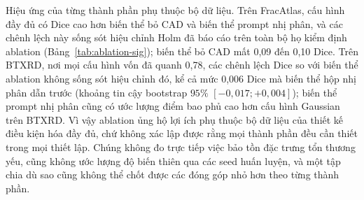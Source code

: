 \documentclass[11pt]{article}
\begin{document}
\begin{table}[H]
\caption{So sánh bắt cặp mô hình đầy đủ với từng biến thể, Dice từng ảnh trên một tập chia. $\Delta$ là chênh Dice trung bình từng ảnh (đầy đủ trừ biến thể), kiểm định hoán vị bắt cặp đổi dấu hai phía ($20{.}000$ lần). $^{**}$ đánh dấu ô còn ý nghĩa ($p<0{,}05$) sau hiệu chỉnh Holm trên toàn bộ họ kiểm định ablation (bốn biến thể ablation $\times$ hai bộ dữ liệu $\times$ hai điều kiện prompt, tất cả trên Dice, độ đo duy nhất được kiểm định ở đây); $^{*}$ đánh dấu $p<0{,}05$ thô không sống sót hiệu chỉnh.}
\label{tab:ablation-sig}
\centering
\scriptsize
{}
\end{table}

Hiệu ứng của từng thành phần phụ thuộc bộ dữ liệu. Trên FracAtlas, cấu hình đầy đủ có Dice cao hơn biến thể bỏ CAD và biến thể prompt nhị phân, và các chênh lệch này sống sót hiệu chỉnh Holm đã báo cáo trên toàn bộ họ kiểm định ablation (Bảng~\ref{tab:ablation-sig}); biến thể bỏ CAD mất 0,09 đến 0,10 Dice. Trên BTXRD, nơi mọi cấu hình vốn đã quanh 0,78, các chênh lệch Dice so với biến thể ablation không sống sót hiệu chỉnh đó, kể cả mức 0,006 Dice mà biến thể hộp nhị phân dẫn trước (khoảng tin cậy bootstrap $95\%$ $[-0{,}017; +0{,}004]$); biến thể prompt nhị phân cũng có ước lượng điểm bao phủ cao hơn cấu hình Gaussian trên BTXRD. Vì vậy ablation ủng hộ lợi ích phụ thuộc bộ dữ liệu của thiết kế điều kiện hóa đầy đủ, chứ không xác lập được rằng mọi thành phần đều cần thiết trong mọi thiết lập. Chúng không đo trực tiếp việc bảo tồn đặc trưng tổn thương yếu, cũng không ước lượng độ biến thiên qua các seed huấn luyện, và một tập chia dù sao cũng không thể chốt được các đóng góp nhỏ hơn theo từng thành phần.
\end{document}
